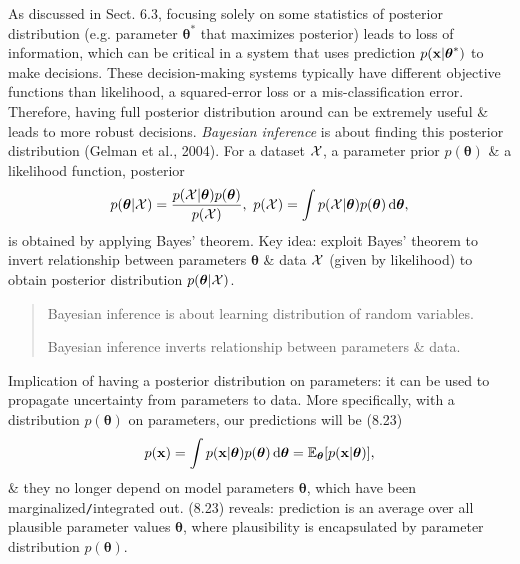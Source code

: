 \documentclass{article}
\begin{document}
\begin{itemize}
\begin{itemize}
\begin{itemize}
			As discussed in Sect. 6.3, focusing solely on some statistics of posterior distribution (e.g. parameter $\boldsymbol{\theta}^*$ that maximizes posterior) leads to loss of information, which can be critical in a system that uses prediction $p({\bf x}|\boldsymbol{\theta}^*)$ to make decisions. These decision-making systems typically have different objective functions than likelihood, a squared-error loss or a mis-classification error. Therefore, having full posterior distribution around can be extremely useful \& leads to more robust decisions. {\it Bayesian inference} is about finding this posterior distribution (Gelman et al., 2004). For a dataset ${\cal X}$, a parameter prior $p(\boldsymbol{\theta})$ \& a likelihood function, posterior
			\begin{equation}
				p(\boldsymbol{\theta}|{\cal X}) = \frac{p({\cal X}|\boldsymbol{\theta})p(\boldsymbol{\theta})}{p({\cal X})},\ p({\cal X}) = \int p({\cal X}|\boldsymbol{\theta})p(\boldsymbol{\theta})\,{\rm d}\boldsymbol{\theta},
			\end{equation}
			is obtained by applying Bayes' theorem. Key idea: exploit Bayes' theorem to invert relationship between parameters $\boldsymbol{\theta}$ \& data ${\cal X}$ (given by likelihood) to obtain posterior distribution $p(\boldsymbol{\theta}|{\cal X})$.
			\begin{quote}
				Bayesian inference is about learning distribution of random variables.
				
				Bayesian inference inverts relationship between parameters \& data.
			\end{quote}
			Implication of having a posterior distribution on parameters: it can be used to propagate uncertainty from parameters to data. More specifically, with a distribution $p(\boldsymbol{\theta})$ on parameters, our predictions will be (8.23)
			\begin{equation}
				p({\bf x}) = \int p({\bf x}|\boldsymbol{\theta})p(\boldsymbol{\theta})\,{\rm d}\boldsymbol{\theta} = \mathbb{E}_{\boldsymbol{\theta}}[p({\bf x}|\boldsymbol{\theta})],
			\end{equation}
			\& they no longer depend on model parameters $\boldsymbol{\theta}$, which have been marginalized{\tt/}integrated out. (8.23) reveals: prediction is an average over all plausible parameter values $\boldsymbol{\theta}$, where plausibility is encapsulated by parameter distribution $p(\boldsymbol{\theta})$.
			

\end{itemize}
\end{itemize}
\end{itemize}
\end{document}
